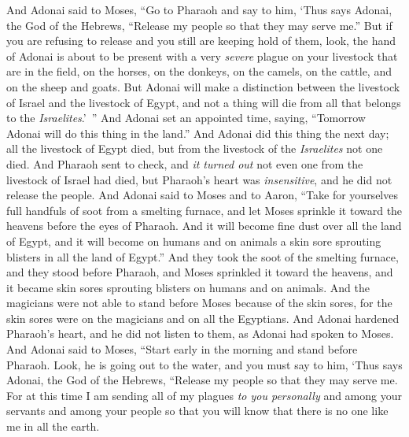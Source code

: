 \begin{biblechapter} %
 And Adonai said to Moses, “Go to Pharaoh and say to him, ‘Thus says Adonai, the God of the Hebrews, “Release my people so that they may serve me.”
\verse But if you are refusing to release and you still are keeping hold of them,
\verse look, the hand of Adonai is about to be present with a very \textit{severe} plague on your livestock that are in the field, on the horses, on the donkeys, on the camels, on the cattle, and on the sheep and goats.
\verse But Adonai will make a distinction between the livestock of Israel and the livestock of Egypt, and not a thing will die from all that belongs to the \textit{Israelites}.’ ”
\verse And Adonai set an appointed time, saying, “Tomorrow Adonai will do this thing in the land.”
\verse And Adonai did this thing the next day; all the livestock of Egypt died, but from the livestock of the \textit{Israelites} not one died.
\verse And Pharaoh sent to check, and \textit{it turned out} not even one from the livestock of Israel had died, but Pharaoh’s heart was \textit{insensitive}, and he did not release the people.
 And Adonai said to Moses and to Aaron, “Take for yourselves full handfuls of soot from a smelting furnace, and let Moses sprinkle it toward the heavens before the eyes of Pharaoh.
\verse And it will become fine dust over all the land of Egypt, and it will become on humans and on animals a skin sore sprouting blisters in all the land of Egypt.”
\verse And they took the soot of the smelting furnace, and they stood before Pharaoh, and Moses sprinkled it toward the heavens, and it became skin sores sprouting blisters on humans and on animals.
\verse And the magicians were not able to stand before Moses because of the skin sores, for the skin sores were on the magicians and on all the Egyptians.
\verse And Adonai hardened Pharaoh’s heart, and he did not listen to them, as Adonai had spoken to Moses.
 And Adonai said to Moses, “Start early in the morning and stand before Pharaoh. Look, he is going out to the water, and you must say to him, ‘Thus says Adonai, the God of the Hebrews, “Release my people so that they may serve me.
\verse For at this time I am sending all of my plagues \textit{to you personally} and among your servants and among your people so that you will know that there is no one like me in all the earth.

\end{biblechapter}
